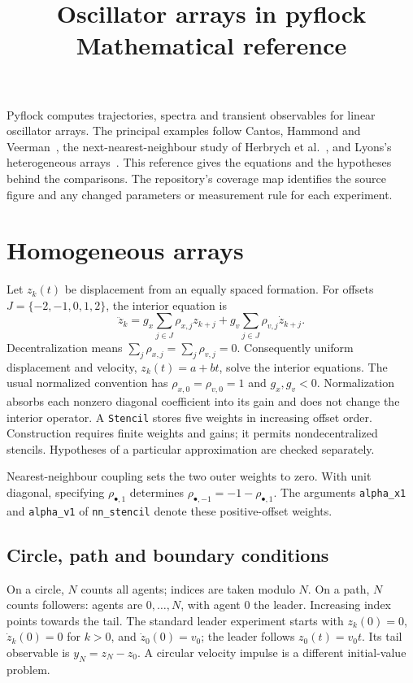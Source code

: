 \documentclass[11pt]{article}
\title{Oscillator arrays in pyflock\\[3pt]\large Mathematical reference}
\author{}
\date{}
\begin{document}
\maketitle
\vspace{-2em}

Pyflock computes trajectories, spectra and transient observables for linear
oscillator arrays. The principal examples follow Cantos, Hammond and
Veerman~\cite{signal,transients}, the next-nearest-neighbour study of
Herbrych et al.~\cite{nnn}, and Lyons's heterogeneous arrays~\cite{lyons}.
This reference gives the equations and the hypotheses behind the comparisons.
The repository's coverage map identifies the source figure and any changed
parameters or measurement rule for each experiment.

\section{Homogeneous arrays}

Let $z_k(t)$ be displacement from an equally spaced formation. For offsets
$J=\{-2,-1,0,1,2\}$, the interior equation is
\begin{equation}\label{eq:model}
 \ddot z_k=g_x\sum_{j\in J}\rho_{x,j}z_{k+j}
          +g_v\sum_{j\in J}\rho_{v,j}\dot z_{k+j}.
\end{equation}
Decentralization means $\sum_j\rho_{x,j}=\sum_j\rho_{v,j}=0$.
Consequently uniform displacement and velocity, $z_k(t)=a+bt$, solve the
interior equations. The usual normalized convention has
$\rho_{x,0}=\rho_{v,0}=1$ and $g_x,g_v<0$.
Normalization absorbs each nonzero diagonal coefficient into its gain and
does not change the interior operator.
A \texttt{Stencil} stores five weights in increasing offset order.
Construction requires finite weights and gains; it permits
nondecentralized stencils. Hypotheses of a particular approximation are
checked separately.

Nearest-neighbour coupling sets the two outer weights to zero.
With unit diagonal, specifying $\rho_{\bullet,1}$ determines
$\rho_{\bullet,-1}=-1-\rho_{\bullet,1}$.
The arguments \texttt{alpha\_x1} and \texttt{alpha\_v1} of
\texttt{nn\_stencil} denote these positive-offset weights.

\subsection{Circle, path and boundary conditions}

On a circle, $N$ counts all agents; indices are taken modulo $N$.
On a path, $N$ counts followers: agents are $0,\ldots,N$,
with agent $0$ the leader. Increasing index points towards the tail.
The standard leader experiment starts with $z_k(0)=0$,
$\dot z_k(0)=0$ for $k>0$, and $\dot z_0(0)=v_0$;
the leader follows $z_0(t)=v_0t$.
Its tail observable is $y_N=z_N-z_0$.
A circular velocity impulse is a different initial-value problem.
\end{document}
